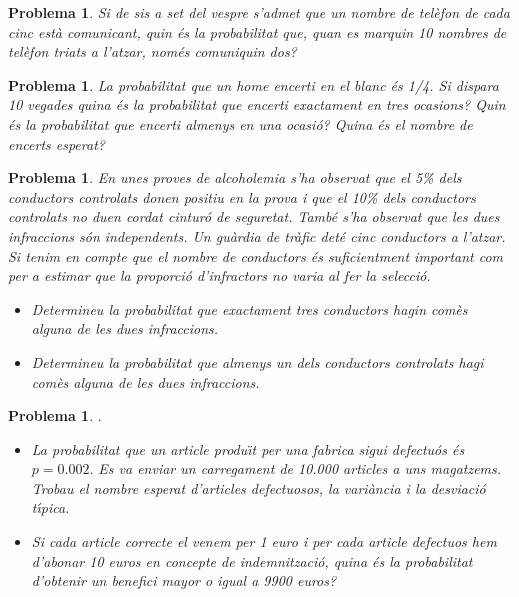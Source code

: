 \documentclass[11pt]{article}
\newcounter{prbcont}
\newtheorem{problema}[prbcont]{Problema}
\begin{document}
\begin{problema}
Si de sis a set del vespre s'admet que un nombre de tel\`efon de cada cinc est\`a comunicant, quin \'es la probabilitat que, quan es marquin 10 nombres de tel\`efon triats a l'atzar, nom\'es comuniquin dos? 
\end{problema}

\begin{problema}
La probabilitat que un home encerti en el blanc \'es 1/4. Si dispara 10 vegades quina \'es la probabilitat que encerti exactament en tres ocasions? Quin \'es la probabilitat que encerti almenys en una ocasi\'o? Quina \'es el nombre de encerts esperat?
\end{problema}

\begin{problema}
En unes proves de alcoholemia s'ha observat que el 5\% dels conductors controlats donen positiu en la prova i que el 10\% dels conductors controlats no duen cordat cintur\'o de seguretat. Tamb\'e s'ha observat que les dues infraccions s\'on independents. Un gu\`ardia de tr\`afic det\'e cinc conductors a l'atzar. Si tenim en compte que el nombre de conductors \'es suficientment important com per a estimar que la proporci\'o d'infractors no varia al fer la selecci\'o. 
\begin{itemize}
\item Determineu la probabilitat que exactament tres conductors hagin com\`es alguna de les dues infraccions. 
\item Determineu la probabilitat que almenys un dels conductors controlats hagi com\`es alguna de les dues infraccions. 
\end{itemize}
\end{problema}

\begin{problema}
\noindent
$.$
\begin{itemize}
\item La probabilitat que un article produ\"{\i}t per una fabrica sigui defectu\'os \'es $p=0.002.$ Es va enviar un carregament de 10.000 articles a uns magatzems. Trobau el nombre esperat d'articles defectuosos, la vari\`ancia i la desviaci\'o t\'{\i}pica.
\item Si cada article correcte el venem per 1 euro i per cada article defectuos hem d'abonar 10 euros en concepte de indemnitzaci\'o, quina \'es la probabilitat d'obtenir un benefici mayor o igual a 9900 euros?  \end{itemize}
\end{problema}
\end{document}
